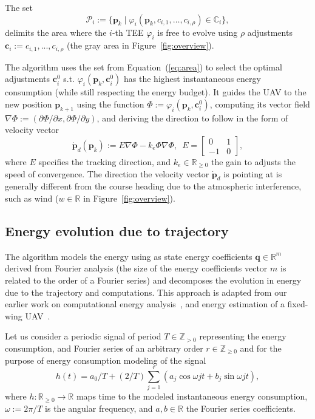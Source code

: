 \documentclass[letterpaper,10pt,conference]{ieeeconf}
\theoremstyle{definition}
\begin{document}
The set
\begin{equation}\label{eq:area}
  \mathcal{P}_i:=\{\mathbf{p}_k\mid\varphi_i(\mathbf{p}_k,c_{i,1},\dots,c_{i,\rho})\in\mathbb{C}_i\},
\end{equation}
delimits the area where the $i$-th TEE $\varphi_i$ is free to evolve using $\rho$ adjustments $\mathbf{c}_i:=c_{i,1},...,c_{i,\rho}$ (the gray area in Figure~\ref{fig:overview}).

The algorithm uses the set from Equation~(\ref{eq:area}) to select the optimal adjustments $\mathbf{c}_i^0$ s.t. $\varphi_i(\mathbf{p}_k,\mathbf{c}_i^0)$ has the highest instantaneous energy consumption (while still respecting the energy budget). It guides the UAV to the new position $\mathbf{p}_{k+1}$ using the function $\varPhi:=\varphi_i(\mathbf{p}_k,\mathbf{c}_i^0)$, computing its vector field $\nabla\varPhi:=(\partial\varPhi/\partial x,\partial\varPhi/\partial y)$, and deriving the direction to follow in the form of velocity vector
\begin{equation}\label{eq:pd}
  \dot{\mathbf{p}}_d(\mathbf{p}_k):=E\nabla\varPhi-k_e\varPhi\nabla\varPhi,\,\,\,E=\begin{bmatrix}
    0&1\\-1&0
  \end{bmatrix},
\end{equation}
where $E$ specifies the tracking direction, and $k_e\in\mathbb{R}_{\geq 0}$ the gain to adjusts the speed of convergence. The direction the velocity vector $\dot{\mathbf{p}}_d$ is pointing at is generally different from the course heading due to the atmospheric interference, such as wind ($w\in\mathbb{R}$ in Figure~\ref{fig:overview}).

\subsection{Energy evolution due to trajectory}
\label{sec:energy-model}

The algorithm models the energy using as state energy coefficients $\mathbf{q}\in\mathbb{R}^m$ derived from Fourier analysis (the size of the energy coefficients vector $m$ is related to the order of a Fourier series) and decomposes the evolution in energy due to the trajectory and computations. This approach is adapted from our earlier work on computational energy analysis~\cite{seewald2019coarse, seewald2019component}, and energy estimation of a fixed-wing UAV~\cite{seewald2020mechanical}. 

Let us consider a periodic signal of period $T\in\mathbb{Z}_{> 0}$ representing the energy consumption, and Fourier series of an arbitrary order $r\in\mathbb{Z}_{\geq 0}$ and for the purpose of energy consumption modeling of the signal
\begin{equation}\label{eq:fourier}
  h(t)=a_0/T+(2/T)\sum_{j=1}^{r}{\left(a_j\cos{\omega jt}+b_j\sin{\omega jt}\right)},
\end{equation}
where $h:\mathbb{R}_{\geq 0}\rightarrow\mathbb{R}$ maps time to the modeled instantaneous energy consumption, $\omega:=2\pi/T$ is the angular frequency, and $a,b\in\mathbb{R}$ the Fourier series coefficients.
\end{document}
